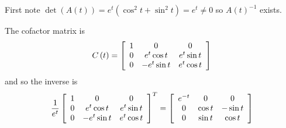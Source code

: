 \begin{solution} First note $\det \left( A\left( t\right) \right) =
e^{t}(\cos^2 t + \sin^2 t) = e^{t}\neq 0$ so $A\left( t\right) ^{-1}$
exists.

The cofactor matrix is
\begin{equation*}
C\left( t\right) =\left[
\begin{array}{ccc}
1 & 0 & 0 \\
0 & e^{t}\cos t & e^{t}\sin t \\
0 & -e^{t}\sin t & e^{t}\cos t
\end{array}
\right]
\end{equation*}
and so the inverse is
\begin{equation*}
\vspace{0.05in}\frac{1}{e^{t}}\leftB
\begin{array}{ccc}
1 & 0 & 0 \\
0 & e^{t}\cos t & e^{t}\sin t \\
0 & -e^{t}\sin t & e^{t}\cos t
\end{array}
\rightB ^{T}= \leftB
\begin{array}{ccc}
e^{-t} & 0 & 0 \\
0 & \cos t & -\sin t \\
0 & \sin t & \cos t
\end{array}
\rightB 
\end{equation*}

\end{solution}
